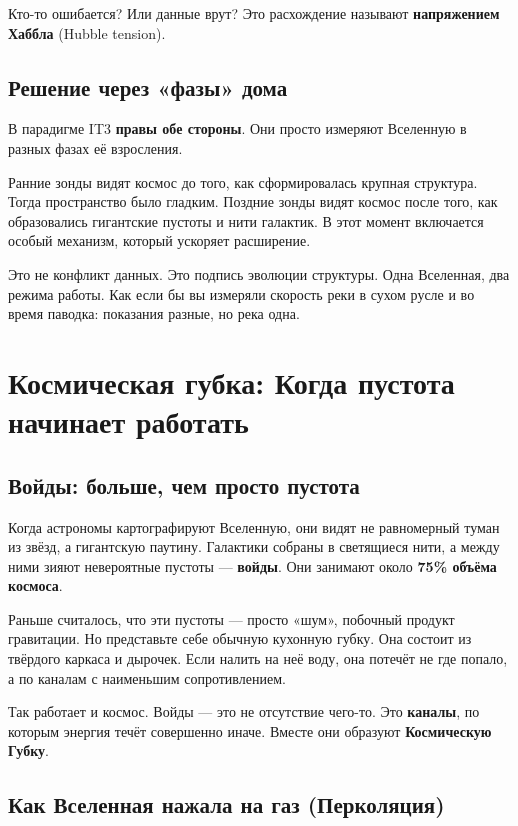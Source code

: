 \documentclass[12pt,a4paper,oneside]{book}
\begin{document}
Кто-то ошибается? Или данные врут? Это расхождение называют \textbf{напряжением Хаббла} (Hubble tension).

\section{Решение через «фазы» дома}

В парадигме IT3 \textbf{правы обе стороны}. Они просто измеряют Вселенную в разных фазах её взросления.

Ранние зонды видят космос до того, как сформировалась крупная структура. Тогда пространство было гладким. Поздние зонды видят космос после того, как образовались гигантские пустоты и нити галактик. В этот момент включается особый механизм, который ускоряет расширение.

Это не конфликт данных. Это подпись эволюции структуры. Одна Вселенная, два режима работы. Как если бы вы измеряли скорость реки в сухом русле и во время паводка: показания разные, но река одна.

\chapter{Космическая губка: Когда пустота начинает работать}

\section{Войды: больше, чем просто пустота}

Когда астрономы картографируют Вселенную, они видят не равномерный туман из звёзд, а гигантскую паутину. Галактики собраны в светящиеся нити, а между ними зияют невероятные пустоты — \textbf{войды}. Они занимают около \textbf{75\% объёма космоса}.

Раньше считалось, что эти пустоты — просто «шум», побочный продукт гравитации. Но представьте себе обычную кухонную губку. Она состоит из твёрдого каркаса и дырочек. Если налить на неё воду, она потечёт не где попало, а по каналам с наименьшим сопротивлением.

Так работает и космос. Войды — это не отсутствие чего-то. Это \textbf{каналы}, по которым энергия течёт совершенно иначе. Вместе они образуют \textbf{Космическую Губку}.

\section{Как Вселенная нажала на газ (Перколяция)}
\end{document}

